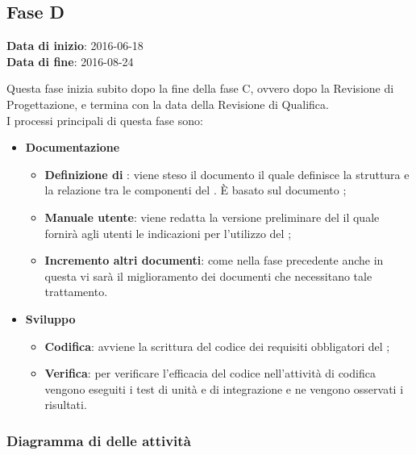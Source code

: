 	\subsection{Fase D}
	\begin{center}
		\textbf{Data di inizio}: 2016-06-18 \\
		\textbf{Data di fine}: 2016-08-24 \\
	\end{center}
	Questa fase inizia subito dopo la fine della fase C, ovvero dopo la Revisione di Progettazione, e termina con la data della Revisione di Qualifica. \\
	I processi principali di questa fase sono: 
		\begin{itemize}
			\item \textbf{Documentazione} 
			\att
			\begin{itemize} 
				\item \textbf{Definizione di }: viene steso il documento \DPdocRQ{} il quale definisce la struttura e la relazione tra le componenti del . È basato sul documento \STdocRQ;
				\item \textbf{Manuale utente}: viene redatta la versione preliminare del \MUdocRQ{} il quale fornirà agli utenti le indicazioni per l'utilizzo del ;
				\item \textbf{Incremento altri documenti}: come nella fase precedente anche in questa vi sarà il miglioramento dei documenti che necessitano tale trattamento.
			\end{itemize}
			\item \textbf{Sviluppo}
			\att
			\begin{itemize}
				\item \textbf{Codifica}: avviene la scrittura del codice dei requisiti obbligatori del ;
				\item \textbf{Verifica}: per verificare l'efficacia del codice  nell'attività di codifica vengono eseguiti i test di unità e di integrazione e ne vengono osservati i risultati. 
			\end{itemize}
		\end{itemize}
		\subsubsection{Diagramma di  delle attività}
		
